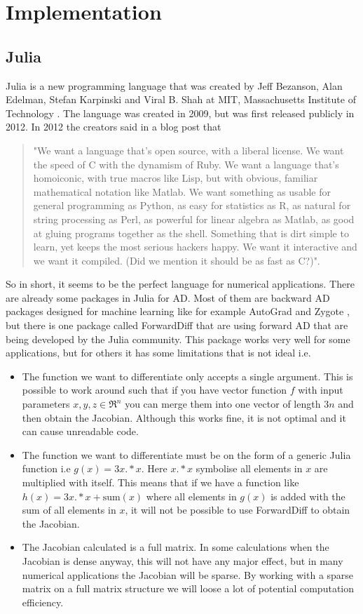 \chapter{Implementation}
\section{Julia}
Julia is a new programming language that was created by Jeff Bezanson, Alan Edelman, Stefan Karpinski and Viral B. Shah  at MIT, Massachusetts Institute of Technology \emph{\citep{juliaLab}}. The language was created in 2009, but was first released publicly in 2012. In 2012 the creators said in a blog post \emph{\citep{juliaBlogRelease2012}} that
\begin{quotation}
"We want a language that’s open source, with a liberal license. We want the speed of C with the dynamism of Ruby. We want a language that’s homoiconic, with true macros like Lisp, but with obvious, familiar mathematical notation like Matlab. We want something as usable for general programming as Python, as easy for statistics as R, as natural for string processing as Perl, as powerful for linear algebra as Matlab, as good at gluing programs together as the shell. Something that is dirt simple to learn, yet keeps the most serious hackers happy. We want it interactive and we want it compiled. (Did we mention it should be as fast as C?)".
\end{quotation}
So in short, it seems to be the perfect language for numerical applications. There are already some packages in Julia for AD. Most of them are backward AD packages designed for machine learning like for example AutoGrad \emph{\citep{knet2016mlsys}} and Zygote \emph{\citep{innes2018don}}, but there is one package called ForwardDiff \emph{\citep{ForwardDiff}} that are using forward AD that are being developed by the Julia community. This package works very well for some applications, but for others it has some limitations that is not ideal i.e. 
\begin{itemize}
    \item The function we want to differentiate only accepts a single argument. This is possible to work around such that if you have vector function $f$ with input parameters $x,y,z \in \Re^n$ you can merge them into one vector of length $3n$ and then obtain the Jacobian. Although this works fine, it is not optimal and it can cause unreadable code.
    \item The function we want to differentiate must be on the form of a generic Julia function i.e $g(x) = 3x.*x$. Here $x.*x$ symbolise all elements in $x$ are multiplied with itself. This means that if we have a function like $h(x) = 3x.*x + \text{sum}(x)$ where all elements in $g(x)$ is added with the sum of all elements in $x$, it will not be possible to use ForwardDiff to obtain the Jacobian.
    \item The Jacobian calculated is a full matrix. In some calculations when the Jacobian is dense anyway, this will not have any major effect, but in many numerical applications the Jacobian will be sparse. By working with a sparse matrix on a full matrix structure we will loose a lot of potential computation efficiency.
\end{itemize}

